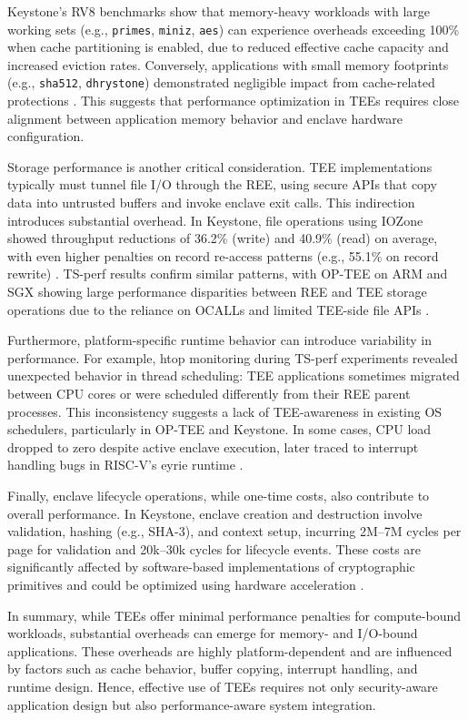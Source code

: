 Keystone's RV8 benchmarks show that memory-heavy workloads with large working sets (e.g., \texttt{primes}, \texttt{miniz}, \texttt{aes}) can experience overheads exceeding 100\% when cache partitioning is enabled, due to reduced effective cache capacity and increased eviction rates. Conversely, applications with small memory footprints (e.g., \texttt{sha512}, \texttt{dhrystone}) demonstrated negligible impact from cache-related protections \cite{dayeol2019keystone}. This suggests that performance optimization in TEEs requires close alignment between application memory behavior and enclave hardware configuration.

Storage performance is another critical consideration. TEE implementations typically must tunnel file I/O through the REE, using secure APIs that copy data into untrusted buffers and invoke enclave exit calls. This indirection introduces substantial overhead. In Keystone, file operations using IOZone showed throughput reductions of 36.2\% (write) and 40.9\% (read) on average, with even higher penalties on record re-access patterns (e.g., 55.1\% on record rewrite) \cite{dayeol2019keystone}. TS-perf results confirm similar patterns, with OP-TEE on ARM and SGX showing large performance disparities between REE and TEE storage operations due to the reliance on OCALLs and limited TEE-side file APIs \cite{Suzaki2021}.

Furthermore, platform-specific runtime behavior can introduce variability in performance. For example, htop monitoring during TS-perf experiments revealed unexpected behavior in thread scheduling: TEE applications sometimes migrated between CPU cores or were scheduled differently from their REE parent processes. This inconsistency suggests a lack of TEE-awareness in existing OS schedulers, particularly in OP-TEE and Keystone. In some cases, CPU load dropped to zero despite active enclave execution, later traced to interrupt handling bugs in RISC-V’s eyrie runtime \cite{Suzaki2021}.

Finally, enclave lifecycle operations, while one-time costs, also contribute to overall performance. In Keystone, enclave creation and destruction involve validation, hashing (e.g., SHA-3), and context setup, incurring 2M–7M cycles per page for validation and 20k–30k cycles for lifecycle events. These costs are significantly affected by software-based implementations of cryptographic primitives and could be optimized using hardware acceleration \cite{dayeol2019keystone}.

In summary, while TEEs offer minimal performance penalties for compute-bound workloads, substantial overheads can emerge for memory- and I/O-bound applications. These overheads are highly platform-dependent and are influenced by factors such as cache behavior, buffer copying, interrupt handling, and runtime design. Hence, effective use of TEEs requires not only security-aware application design but also performance-aware system integration.


